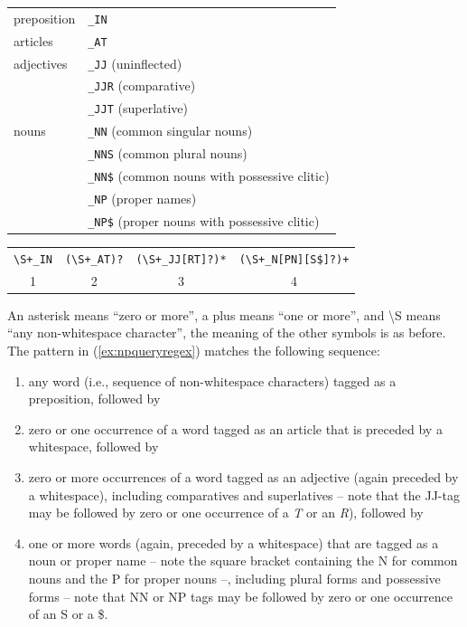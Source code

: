\begin{exe}
\ex
\begin{tabular}[t]{ll}
preposition & \texttt{\_IN}\\
articles & \texttt{\_AT}\\
adjectives & \texttt{\_JJ} (uninflected)\\
 & \texttt{\_JJR} (comparative)\\
 & \texttt{\_JJT} (superlative)\\
nouns & \texttt{\_NN} (common singular nouns)\\
 & \texttt{\_NNS} (common plural nouns)\\
 & \texttt{\_NN\$} (common nouns with possessive clitic)\\
 & \texttt{\_NP} (proper names)\\
 & \texttt{\_NP\$} (proper nouns with possessive clitic)
\end{tabular}
\label{ex:browntags}
\end{exe}

\begin{exe}
\ex
\begin{tabular}[t]{cccc}
\texttt{\textbackslash{}S+\_IN} & \texttt{(\textbackslash{}S+\_AT)?} & \texttt{(\textbackslash{}S+\_JJ[RT]?)*} & \texttt{(\textbackslash{}S+\_N[PN][S\$]?)+}\\
1 & 2 & 3 & 4
\end{tabular}
\label{ex:npqueryregex}
\end{exe}

An asterisk means ``zero or more'', a plus means ``one or more'', and \textbackslash{}S means ``any non-whitespace character'', the meaning of the other symbols is as before. The pattern in (\ref{ex:npqueryregex}) matches the following sequence:

\begin{enumerate}
\item any word (i.e., sequence of non-whitespace characters) tagged as a preposition, followed by 
\item zero or one occurrence of a word tagged as an article that is preceded by a whitespace, followed by
\item zero or more occurrences of a word tagged as an adjective (again preceded by a whitespace), including comparatives and superlatives -- note that the JJ-tag may be followed by zero or one occurrence of a \textit{T} or an \textit{R}), followed by
\item one or more words (again, preceded by a whitespace) that are tagged as a noun or proper name -- note the square bracket containing the N for common nouns and the P for proper nouns --, including plural forms and possessive forms -- note that NN or NP tags may be followed by zero or one occurrence of an S or a \$.
\end{enumerate}

